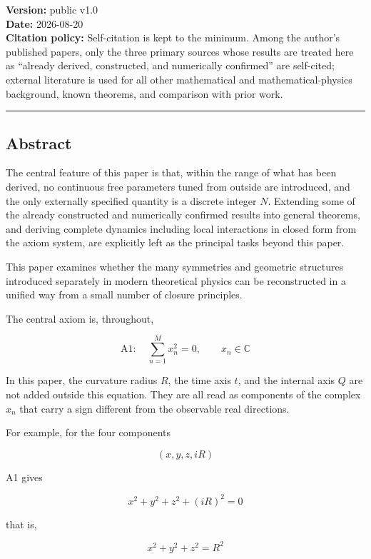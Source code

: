 \documentclass[
  a4paper,
]{article}
\begin{document}
\textbf{Version:} public v1.0\\
\textbf{Date:} 2026-08-20\\
\textbf{Citation policy:} Self-citation is kept to the minimum. Among
the author's published papers, only the three primary sources whose
results are treated here as ``already derived, constructed, and
numerically confirmed'' are self-cited; external literature is used for
all other mathematical and mathematical-physics background, known
theorems, and comparison with prior work.

\begin{center}\rule{0.5\linewidth}{0.5pt}\end{center}

\subsection{Abstract}\label{abstract}

The central feature of this paper is that, within the range of what has
been derived, no continuous free parameters tuned from outside are
introduced, and the only externally specified quantity is a discrete
integer \(N\). Extending some of the already constructed and numerically
confirmed results into general theorems, and deriving complete dynamics
including local interactions in closed form from the axiom system, are
explicitly left as the principal tasks beyond this paper.

This paper examines whether the many symmetries and geometric structures
introduced separately in modern theoretical physics can be reconstructed
in a unified way from a small number of closure principles.

The central axiom is, throughout,

\[
\boxed{
\mathrm{A1}:\quad
\sum_{n=1}^{M} x_n^2=0,
\qquad x_n\in\mathbb C
}
\]

In this paper, the curvature radius \(R\), the time axis \(t\), and the
internal axis \(Q\) are not added outside this equation. They are all
read as components of the complex \(x_n\) that carry a sign different
from the observable real directions.

For example, for the four components

\[
(x,y,z,iR)
\]

A1 gives

\[
x^2+y^2+z^2+(iR)^2=0
\]

that is,

\[
\boxed{
x^2+y^2+z^2=R^2
}
\]
\end{document}
